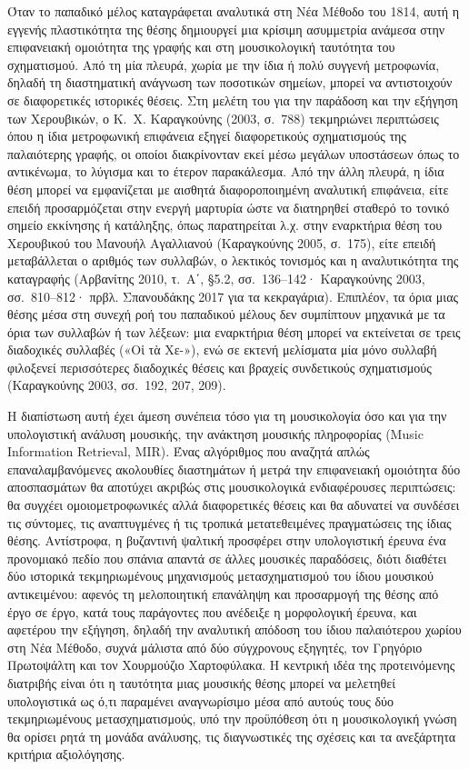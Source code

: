 \documentclass[11pt,a4paper]{article}
\begin{document}
Όταν το παπαδικό μέλος καταγράφεται αναλυτικά στη Νέα Μέθοδο του 1814, αυτή η εγγενής πλαστικότητα της θέσης δημιουργεί μια κρίσιμη ασυμμετρία ανάμεσα στην επιφανειακή ομοιότητα της γραφής και στη μουσικολογική ταυτότητα του σχηματισμού. Από τη μία πλευρά, χωρία με την ίδια ή πολύ συγγενή μετροφωνία, δηλαδή τη διαστηματική ανάγνωση των ποσοτικών σημείων, μπορεί να αντιστοιχούν σε διαφορετικές ιστορικές θέσεις. Στη μελέτη του για την παράδοση και την εξήγηση των Χερουβικών, ο Κ.~Χ. Καραγκούνης (2003, σ.~788) τεκμηριώνει περιπτώσεις όπου η ίδια μετροφωνική επιφάνεια εξηγεί διαφορετικούς σχηματισμούς της παλαιότερης γραφής, οι οποίοι διακρίνονταν εκεί μέσω μεγάλων υποστάσεων όπως το αντικένωμα, το λύγισμα και το έτερον παρακάλεσμα. Από την άλλη πλευρά, η ίδια θέση μπορεί να εμφανίζεται με αισθητά διαφοροποιημένη αναλυτική επιφάνεια, είτε επειδή προσαρμόζεται στην ενεργή μαρτυρία ώστε να διατηρηθεί σταθερό το τονικό σημείο εκκίνησης ή κατάληξης, όπως παρατηρείται λ.χ. στην εναρκτήρια θέση του Χερουβικού του Μανουήλ Αγαλλιανού (Καραγκούνης 2005, σ.~175), είτε επειδή μεταβάλλεται ο αριθμός των συλλαβών, ο λεκτικός τονισμός και η αναλυτικότητα της καταγραφής (Αρβανίτης 2010, τ.~Α΄, §5.2, σσ.~136--142· Καραγκούνης 2003, σσ.~810--812· πρβλ. Σπανουδάκης 2017 για τα κεκραγάρια). Επιπλέον, τα όρια μιας θέσης μέσα στη συνεχή ροή του παπαδικού μέλους δεν συμπίπτουν μηχανικά με τα όρια των συλλαβών ή των λέξεων: μια εναρκτήρια θέση μπορεί να εκτείνεται σε τρεις διαδοχικές συλλαβές («Οἱ τὰ Χε-»), ενώ σε εκτενή μελίσματα μία μόνο συλλαβή φιλοξενεί περισσότερες διαδοχικές θέσεις και βραχείς συνδετικούς σχηματισμούς (Καραγκούνης 2003, σσ.~192, 207, 209).

Η διαπίστωση αυτή έχει άμεση συνέπεια τόσο για τη μουσικολογία όσο και για την υπολογιστική ανάλυση μουσικής, την ανάκτηση μουσικής πληροφορίας (Music Information Retrieval, MIR). Ένας αλγόριθμος που αναζητά απλώς επαναλαμβανόμενες ακολουθίες διαστημάτων ή μετρά την επιφανειακή ομοιότητα δύο αποσπασμάτων θα αποτύχει ακριβώς στις μουσικολογικά ενδιαφέρουσες περιπτώσεις: θα συγχέει ομοιομετροφωνικές αλλά διαφορετικές θέσεις και θα αδυνατεί να συνδέσει τις σύντομες, τις αναπτυγμένες ή τις τροπικά μετατεθειμένες πραγματώσεις της ίδιας θέσης. Αντίστροφα, η βυζαντινή ψαλτική προσφέρει στην υπολογιστική έρευνα ένα προνομιακό πεδίο που σπάνια απαντά σε άλλες μουσικές παραδόσεις, διότι διαθέτει δύο ιστορικά τεκμηριωμένους μηχανισμούς μετασχηματισμού του ίδιου μουσικού αντικειμένου: αφενός τη μελοποιητική επανάληψη και προσαρμογή της θέσης από έργο σε έργο, κατά τους παράγοντες που ανέδειξε η μορφολογική έρευνα, και αφετέρου την εξήγηση, δηλαδή την αναλυτική απόδοση του ίδιου παλαιότερου χωρίου στη Νέα Μέθοδο, συχνά μάλιστα από δύο σύγχρονους εξηγητές, τον Γρηγόριο Πρωτοψάλτη και τον Χουρμούζιο Χαρτοφύλακα. Η κεντρική ιδέα της προτεινόμενης διατριβής είναι ότι η ταυτότητα μιας μουσικής θέσης μπορεί να μελετηθεί υπολογιστικά ως ό,τι παραμένει αναγνωρίσιμο μέσα από αυτούς τους δύο τεκμηριωμένους μετασχηματισμούς, υπό την προϋπόθεση ότι η μουσικολογική γνώση θα ορίσει ρητά τη μονάδα ανάλυσης, τις διαγνωστικές της σχέσεις και τα ανεξάρτητα κριτήρια αξιολόγησης.
\end{document}
